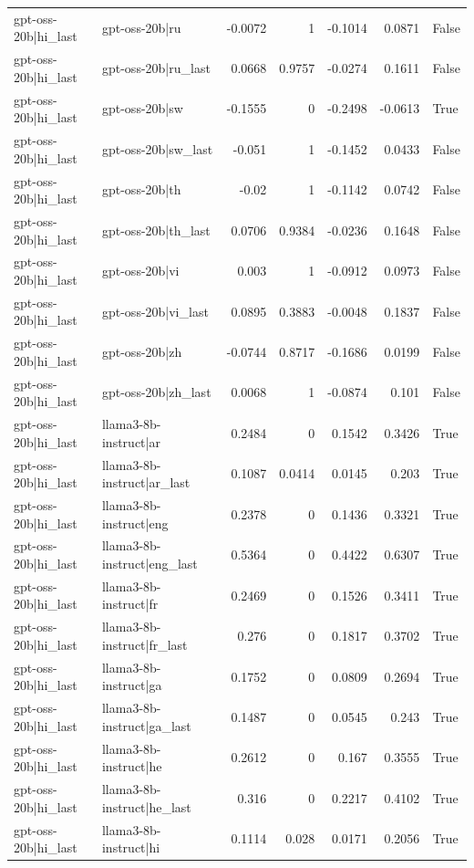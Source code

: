 \begin{table}
\begin{tabular}{l l r r r r l}
gpt-oss-20b|hi_last & gpt-oss-20b|ru & -0.0072 & 1 & -0.1014 & 0.0871 & False \\
gpt-oss-20b|hi_last & gpt-oss-20b|ru_last & 0.0668 & 0.9757 & -0.0274 & 0.1611 & False \\
gpt-oss-20b|hi_last & gpt-oss-20b|sw & -0.1555 & 0 & -0.2498 & -0.0613 & True \\
gpt-oss-20b|hi_last & gpt-oss-20b|sw_last & -0.051 & 1 & -0.1452 & 0.0433 & False \\
gpt-oss-20b|hi_last & gpt-oss-20b|th & -0.02 & 1 & -0.1142 & 0.0742 & False \\
gpt-oss-20b|hi_last & gpt-oss-20b|th_last & 0.0706 & 0.9384 & -0.0236 & 0.1648 & False \\
gpt-oss-20b|hi_last & gpt-oss-20b|vi & 0.003 & 1 & -0.0912 & 0.0973 & False \\
gpt-oss-20b|hi_last & gpt-oss-20b|vi_last & 0.0895 & 0.3883 & -0.0048 & 0.1837 & False \\
gpt-oss-20b|hi_last & gpt-oss-20b|zh & -0.0744 & 0.8717 & -0.1686 & 0.0199 & False \\
gpt-oss-20b|hi_last & gpt-oss-20b|zh_last & 0.0068 & 1 & -0.0874 & 0.101 & False \\
gpt-oss-20b|hi_last & llama3-8b-instruct|ar & 0.2484 & 0 & 0.1542 & 0.3426 & True \\
gpt-oss-20b|hi_last & llama3-8b-instruct|ar_last & 0.1087 & 0.0414 & 0.0145 & 0.203 & True \\
gpt-oss-20b|hi_last & llama3-8b-instruct|eng & 0.2378 & 0 & 0.1436 & 0.3321 & True \\
gpt-oss-20b|hi_last & llama3-8b-instruct|eng_last & 0.5364 & 0 & 0.4422 & 0.6307 & True \\
gpt-oss-20b|hi_last & llama3-8b-instruct|fr & 0.2469 & 0 & 0.1526 & 0.3411 & True \\
gpt-oss-20b|hi_last & llama3-8b-instruct|fr_last & 0.276 & 0 & 0.1817 & 0.3702 & True \\
gpt-oss-20b|hi_last & llama3-8b-instruct|ga & 0.1752 & 0 & 0.0809 & 0.2694 & True \\
gpt-oss-20b|hi_last & llama3-8b-instruct|ga_last & 0.1487 & 0 & 0.0545 & 0.243 & True \\
gpt-oss-20b|hi_last & llama3-8b-instruct|he & 0.2612 & 0 & 0.167 & 0.3555 & True \\
gpt-oss-20b|hi_last & llama3-8b-instruct|he_last & 0.316 & 0 & 0.2217 & 0.4102 & True \\
gpt-oss-20b|hi_last & llama3-8b-instruct|hi & 0.1114 & 0.028 & 0.0171 & 0.2056 & True \\

\end{tabular}
\end{table}

